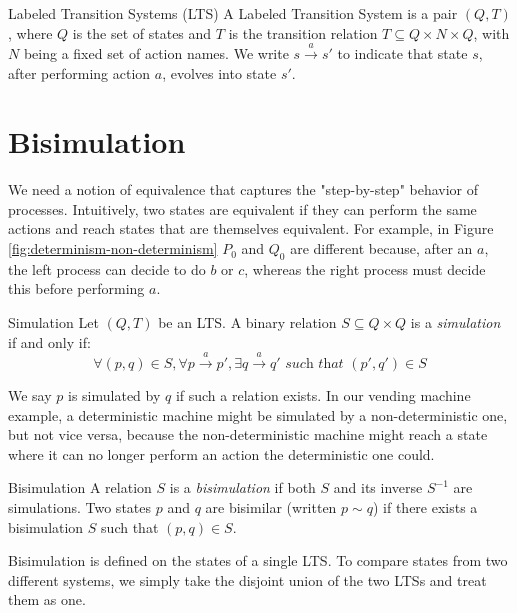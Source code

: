 \begin{Definition}{Labeled Transition Systems (LTS)}{}
A Labeled Transition System is a pair $(Q,T)$, where $Q$ is the set of states and $T$ is the transition relation $T\subseteq Q\times N\times Q$, with $N$ being a fixed set of action names. We write $s\xrightarrow{a}s'$ to indicate that state $s$, after performing action $a$, evolves into state $s'$.
\end{Definition}

\section{Bisimulation}
We need a notion of equivalence that captures the "step-by-step" behavior of processes. Intuitively, two states are equivalent if they can perform the same actions and reach states that are themselves equivalent. 
For example, in Figure \ref{fig:determinism-non-determinism} $P_0$ and $Q_0$ are different because, after an $a$, the left process can decide to do $b$ or $c$, whereas the right process must decide this before performing $a$.

\begin{Definition}{Simulation}{}
Let $(Q,T)$ be an LTS. A binary relation $S\subseteq Q\times Q$ is a \textit{simulation} if and only if:
\begin{equation*}
    \forall(p,q)\in S,\forall p\xrightarrow{a}p',\exists q\xrightarrow{a}q' \textit{ such that } (p',q')\in S
\end{equation*}
\end{Definition}

We say $p$ is simulated by $q$ if such a relation exists. In our vending machine example, a deterministic machine might be simulated by a non-deterministic one, but not vice versa, because the non-deterministic machine might reach a state where it can no longer perform an action the deterministic one could. 

\begin{Definition}{Bisimulation}{}
A relation $S$ is a \textit{bisimulation} if both $S$ and its inverse $S^{-1}$ are simulations. Two states $p$ and $q$ are bisimilar (written $p\sim q$) if there exists a bisimulation $S$ such that $(p,q)\in S$.
\end{Definition}

Bisimulation is defined on the states of a single LTS. To compare states from two different systems, we simply take the disjoint union of the two LTSs and treat them as one.

